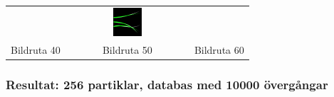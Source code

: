 \documentclass[]{beamer}
\renewcommand{\oe}{\"{o}}
\begin{document}
\begin{frame}
\begin{center}
\begin{tabular}{ccc}
      & \includegraphics[width=0.25\textwidth]{tracking/frame60.png}
      \\
      Bildruta 40 & Bildruta 50 & Bildruta 60\\
    \end{tabular}
  \end{center}
\end{frame}

\begin{frame}
  \frametitle{Resultat: 256 partiklar, databas med 10000 \oe verg\aa ngar}
  

\end{frame}
\end{document}
